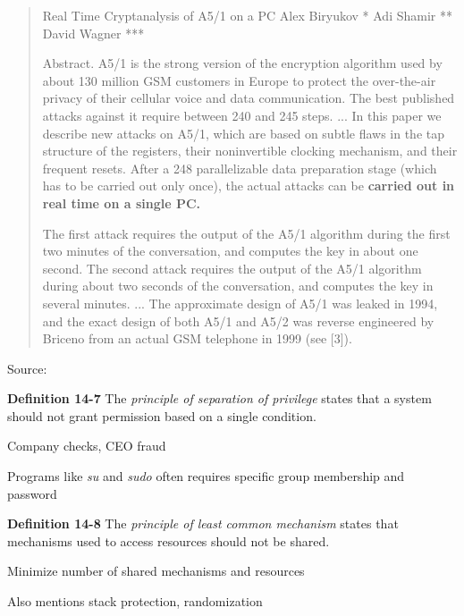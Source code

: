 \documentclass[Screen16to9,17pt]{foils}
\begin{document}

\begin{quote}
  Real Time Cryptanalysis of A5/1 on a PC
Alex Biryukov * Adi Shamir ** David Wagner ***

  Abstract. A5/1 is the strong version of the encryption algorithm used by about 130 million GSM customers in Europe to protect the over-the-air privacy of their cellular voice and data communication. The best published attacks against it require between 240 and 245 steps. ...
  In this paper we describe new attacks on A5/1, which are based on subtle flaws in the tap structure of the registers, their noninvertible clocking mechanism, and their frequent resets. After a 248 parallelizable data preparation stage (which has to be carried out only once), the actual attacks can be {\bf carried out in real time on a single PC.}

  The first attack requires the output of the A5/1 algorithm during the first two minutes of the conversation, and computes the key in about one second. The second attack requires the output of the A5/1 algorithm during about two seconds of the conversation, and computes the key in several minutes.
  ...
  The approximate design of A5/1 was leaked in 1994, and the exact design of both A5/1 and A5/2 was reverse engineered by Briceno from an actual GSM telephone in 1999 (see [3]).
\end{quote}
Source: 




\begin{list1}
\item {\bf Definition 14-7} The \emph{principle of separation of privilege} states that a system should not grant permission based on a single condition.
\item Company checks, CEO fraud
\item Programs like \emph{su} and \emph{sudo} often requires specific group membership and password
\end{list1}



\begin{list1}
\item {\bf Definition 14-8} The \emph{principle of least common mechanism} states that mechanisms used to access resources should not be shared.
\item Minimize number of shared mechanisms and resources
\item Also mentions stack protection, randomization
\end{list1}
\end{document}
